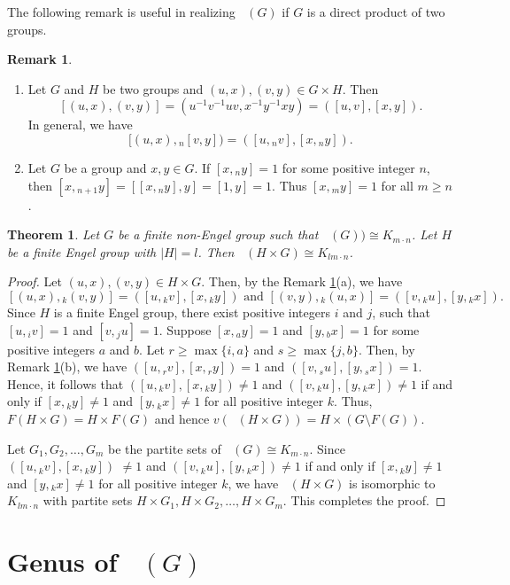 \documentclass[reqno,12pt]{amsart}
\theoremstyle{plain}
\newtheorem{thm}{Theorem}[section]
\theoremstyle{definition}
\newtheorem{rem}[conj]{Remark}
\newcommand{\coeng}{\mathop{\mathcal{E}_c^-}}
\begin{document}
The following remark is useful in realizing $\coeng(G)$ if $G$ is a  direct product of two groups.
\begin{rem}\label{remcr}
\begin{enumerate}
\item Let $G$ and $H$ be two groups and $(u,x),(v,y)\in G\times H$. Then
\[
[(u,x),(v,y)]=(u^{-1}v^{-1}uv,x^{-1}y^{-1}xy)=([u,v],[x,y]).
\]
In general, we have
\[
[(u,x), {}_n[v,y])=([u, {}_nv],[x, {}_ny]).
\]
\item Let $G$ be a group and $x,y \in G$. If $[x, {}_ny]=1$ for some positive integer $n$, then $[x, {}_{n+1}y]=[[x, {}_ny],y]=[1,y]=1$. Thus $[x, {}_my]=1$ for all $m\geq n$.
\end{enumerate}
\end{rem}

\begin{thm}\label{bipar} 
Let $G$ be a finite non-Engel group such that $\coeng(G))\cong K_{m \cdot n}$. Let $H$ be a finite Engel group with $|H|=l$. Then $\coeng(H\times G)\cong K_{lm \cdot n}$. 
\end{thm}
\begin{proof}
Let $(u,x),(v,y)\in H\times G$. Then, by the Remark \ref{remcr}(a), we have
$$
[(u,x), {}_k(v,y)]=([u, {}_kv],[x, {}_ky])\text{ and } [(v,y), {}_k(u,x)]=([v, {}_ku],[y, {}_kx]).
$$
Since $H$ is a finite Engel group, there exist  positive integers $i$ and $j$, such that $[u, {}_iv]=1$ and $[v, {}_ju]=1$. Suppose $[x, {}_ay]=1$ and $[y, {}_bx]=1$ for some positive integers $a$ and $b$. Let $r\geq \max\{i,a\}$ and $s\geq \max\{j,b\}$. Then, by Remark \ref{remcr}(b), we have $([u, {}_rv],[x, {}_ry])=1$ and $([v, {}_su],[y, {}_sx])=1$. Hence, it follows that $([u, {}_kv],[x, {}_ky])\neq 1$ and $([v, {}_ku],[y, {}_kx])\neq 1$ if and only if $[x, {}_ky]\neq 1$ and $[y, {}_kx]\neq 1$ for all positive integer $k$. Thus, $F(H\times G)=H\times F(G)$ and hence $v(\coeng(H\times G))=H\times (G \setminus F(G))$. 

Let $G_1, G_2,\dots,G_m$ be the partite sets of $\coeng(G) \cong K_{m \cdot n}$. Since  $([u, {}_kv],[x, {}_ky])$ $\neq 1$ and $([v, {}_ku],[y, {}_kx])\neq 1$ if and only if $[x, {}_ky]\neq 1$ and $[y, {}_kx]\neq 1$ for all positive integer $k$, we have $\coeng(H\times G)$ is isomorphic to $K_{lm \cdot n}$ with partite sets $H\times G_1, H\times G_2,\dots,H\times G_m$. This completes the proof.
\end{proof}


\section{Genus of $\coeng(G)$}\label{S:Genus}
\end{document}
